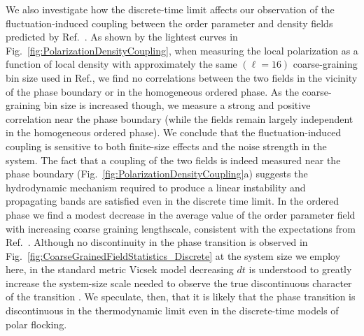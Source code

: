 \documentclass[twoside,twocolumn,9pt]{article}
\begin{document}
We also investigate how the discrete-time limit affects our observation of the fluctuation-induced coupling between the order parameter and density fields predicted by Ref.~\cite{martin2021fluctuation}.
As shown by the lightest curves in Fig.~\ref{fig:PolarizationDensityCoupling}, when measuring the local polarization as a function of local density with approximately the same $(\ell=16)$ coarse-graining bin size used in Ref.\cite{ginelli2010relevance}, we find no correlations between the two fields in the vicinity of the phase boundary or in the homogeneous ordered phase. 
As the coarse-graining bin size is increased though, we measure a strong and positive correlation near the phase boundary (while the fields remain largely independent in the homogeneous ordered phase).
We conclude that the fluctuation-induced coupling is sensitive to both finite-size effects and the noise strength in the system. 
The fact that a coupling of the two fields is indeed measured near the phase boundary (Fig.~\ref{fig:PolarizationDensityCoupling}a) suggests the hydrodynamic mechanism required to produce a linear instability and propagating bands are satisfied even in the discrete time limit. 
In the ordered phase we find a modest decrease in the average value of the order parameter field with increasing coarse graining lengthscale, consistent with the expectations from Ref.~\cite{ginelli2010relevance}.
Although no discontinuity in the phase transition is observed in Fig.~\ref{fig:CoarseGrainedFieldStatistics_Discrete} at the system size we employ here, in the standard metric Vicsek model decreasing $dt$ is understood to greatly increase the system-size scale needed to observe the true discontinuous character of the transition \cite{chate2008collective}.
We speculate, then, that it is likely that the phase transition is discontinuous in the thermodynamic limit even in the discrete-time models of polar flocking.
\end{document}
